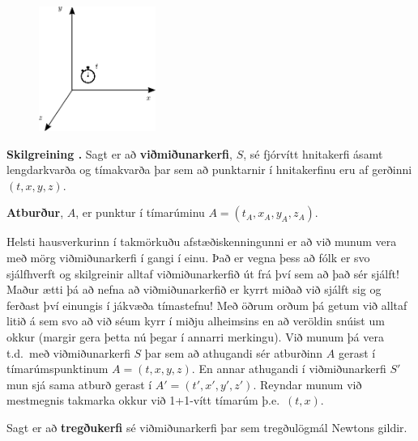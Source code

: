 \begin{tcolorbox}
\begin{minipage}{\linewidth}

\begin{figure}
\vspace{-0.5cm}
\hspace{0.5cm}
\includegraphics[width = 1.5in]{figures/spacetime.pdf}
\end{figure}
\textbf{Skilgreining \thetheorem.} Sagt er að \textbf{viðmiðunarkerfi}, $S$, sé fjórvítt hnitakerfi ásamt lengdarkvarða og tímakvarða þar sem að punktarnir í hnitakerfinu eru af gerðinni $(t,x,y,z)$.

\vspace{1.2cm}
\textbf{Atburður}, $A$, er punktur í tímarúminu $A = (t_A,x_A,y_A,z_A)$.
\vspace{1cm}
\end{minipage}
\end{tcolorbox}

Helsti hausverkurinn í takmörkuðu afstæðiskenningunni er að við munum vera með mörg viðmiðunarkerfi í gangi í einu. Það er vegna þess að fólk er svo sjálfhverft og skilgreinir alltaf viðmiðunarkerfið út frá því sem að það sér sjálft! Maður ætti þá að nefna að viðmiðunarkerfið er kyrrt miðað við sjálft sig og ferðast því einungis í jákvæða tímastefnu! Með öðrum orðum þá getum við alltaf litið á sem svo að við séum kyrr í miðju alheimsins en að veröldin snúist um okkur (margir gera þetta nú þegar í annarri merkingu). Við munum þá vera t.d.~með viðmiðunarkerfi $S$ þar sem að athugandi sér atburðinn $A$ gerast í tímarúmspunktinum $A = (t,x,y,z)$. En annar athugandi í viðmiðunarkerfi $S'$ mun sjá sama atburð gerast í $A' = (t',x',y',z')$. Reyndar munum við mestmegnis takmarka okkur við 1+1-vítt tímarúm þ.e.~$(t,x)$. \\

\begin{tcolorbox}
\begin{definition}
Sagt er að \textbf{tregðukerfi} sé viðmiðunarkerfi þar sem tregðulögmál Newtons gildir.
\end{definition}
\end{tcolorbox}

